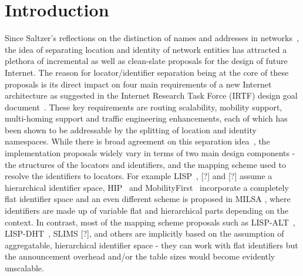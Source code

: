 \section{Introduction}

Since Saltzer's reflections on the distinction of names and addresses in networks~\cite{saltzer}, the idea of separating location and identity of network entities has attracted a plethora of incremental as well as clean-slate proposals for the design of future Internet. The reason for locator/identifier separation being at the core of these proposals is its direct impact on four main requirements of a new Internet architecture as suggested in the Internet Research Task Force (IRTF) design goal document~\cite{li_design}. These key requirements are routing scalability, mobility support, multi-homing support and traffic engineering enhancements, each of which has been shown to be addressable by the splitting of location and identity namespaces. While there is broad agreement on this separation idea~\cite{li}, the implementation proposals widely vary in terms of two main design components - the structures of the locators and identifiers, and the mapping scheme used to resolve the identifiers to locators. For example LISP~\cite{farinacci}, [?] and [?] assume a hierarchical identifier space, HIP~\cite{moskowitz} and MobilityFirst~\cite{mobilityFirst} incorporate a completely flat identifier space and an even different scheme is proposed in MILSA \cite{milsa}, where identifiers are made up of variable flat and hierarchical parts depending on the context. In contrast, most of the mapping scheme proposals such as LISP-ALT~\cite{farinacci-alt}, LISP-DHT~\cite{mathy}, SLIMS [?], and others are implicitly based on the assumption of aggregatable, hierarchical identifier space - they can work with flat identifiers but the announcement overhead and/or the table sizes would become evidently unscalable. 

